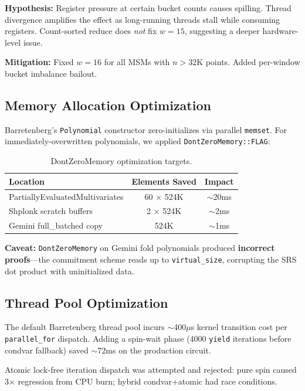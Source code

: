 \documentclass[11pt,a4paper]{article}
\begin{document}
\textbf{Hypothesis:} Register pressure at certain bucket counts causes spilling. Thread divergence amplifies the effect as long-running threads stall while consuming registers. Count-sorted reduce does \emph{not} fix $w=15$, suggesting a deeper hardware-level issue.

\textbf{Mitigation:} Fixed $w=16$ for all MSMs with $n > 32$K points. Added per-window bucket imbalance bailout.

\subsection{Memory Allocation Optimization}

Barretenberg's \texttt{Polynomial} constructor zero-initializes via parallel \texttt{memset}. For immediately-overwritten polynomials, we applied \texttt{DontZeroMemory::FLAG}:

\begin{table}[H]
\centering
\begin{tabular}{lcc}
\toprule
\textbf{Location} & \textbf{Elements Saved} & \textbf{Impact} \\
\midrule
PartiallyEvaluatedMultivariates & 60 $\times$ 524K & $\sim$20ms \\
Shplonk scratch buffers & 2 $\times$ 524K & $\sim$2ms \\
Gemini full\_batched copy & 524K & $\sim$1ms \\
\bottomrule
\end{tabular}
\caption{DontZeroMemory optimization targets.}
\end{table}

\textbf{Caveat:} \texttt{DontZeroMemory} on Gemini fold polynomials produced \textbf{incorrect proofs}---the commitment scheme reads up to \texttt{virtual\_size}, corrupting the SRS dot product with uninitialized data.

\subsection{Thread Pool Optimization}

The default Barretenberg thread pool incurs $\sim$400$\mu$s kernel transition cost per \texttt{parallel\_for} dispatch. Adding a spin-wait phase (4000 \texttt{yield} iterations before condvar fallback) saved $\sim$72ms on the production circuit.

Atomic lock-free iteration dispatch was attempted and rejected: pure spin caused 3$\times$ regression from CPU burn; hybrid condvar+atomic had race conditions.
\end{document}

